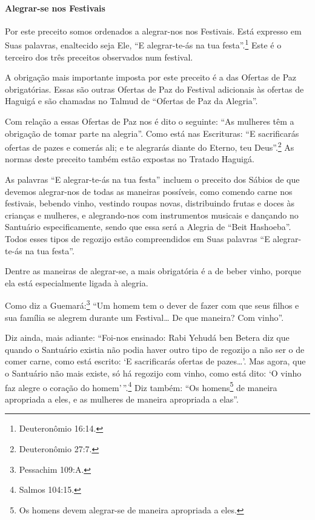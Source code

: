 \paragraph{Alegrar-se nos Festivais}

Por este preceito somos ordenados a alegrar-nos nos Festivais. Está
expresso em Suas palavras, enaltecido seja Ele, ``E alegrar-te-ás na tua
festa''.\footnote{Deuteronômio 16:14.} Este é o terceiro dos três preceitos
observados num festival.

A obrigação mais importante imposta por este preceito é a das Ofertas
de Paz obrigatórias. Essas são outras Ofertas de Paz do Festival
adicionais às ofertas de Haguigá e são chamadas no Talmud de ``Ofertas
de Paz da Alegria''.

Com relação a essas Ofertas de Paz nos é dito o seguinte: ``As mulheres
têm a obrigação de tomar parte na alegria''. Como está nas Escrituras:
``E sacrificarás ofertas de pazes e comerás ali; e te alegrarás diante
do Eterno, teu Deus''.\footnote{Deuteronômio 27:7.} As normas deste preceito
também estão expostas no Tratado Haguigá.

As palavras ``E alegrar-te-ás na tua festa'' incluem o preceito dos
Sábios de que devemos alegrar-nos de todas as maneiras possíveis, como
comendo carne nos festivais, bebendo vinho, vestindo roupas novas,
distribuindo frutas e doces às crianças e mulheres, e alegrando-nos com
instrumentos musicais e dançando no Santuário especificamente, sendo que
essa será a Alegria de ``Beit Hashoeba''. Todos esses tipos de regozijo
estão compreendidos em Suas palavras ``E alegrar-te-ás na tua festa''.

Dentre as maneiras de alegrar-se, a mais obrigatória é a de beber vinho, porque ela está especialmente ligada à alegria.

Como diz a Guemará:\footnote{Pessachim 109:A.} ``Um homem tem o dever de fazer
com que seus filhos e sua família se alegrem durante um Festival\ldots{} De que
maneira? Com vinho''.

Diz ainda, mais adiante: ``Foi-nos ensinado: Rabi Yehudá ben Betera diz
que quando o Santuário existia não podia haver outro tipo de regozijo a
não ser o de comer carne, como está escrito: `E sacrificarás ofertas de
pazes\ldots{}'. Mas agora, que o Santuário não mais existe, só há regozijo com
vinho, como está dito: `O vinho faz alegre o coração do homem'\,''.\footnote{Salmos 104:15.} Diz também:
``Os homens\footnote{Os homens devem alegrar-se de maneira apropriada a eles.} de maneira apropriada a eles, e as
mulheres de maneira apropriada a elas''.

